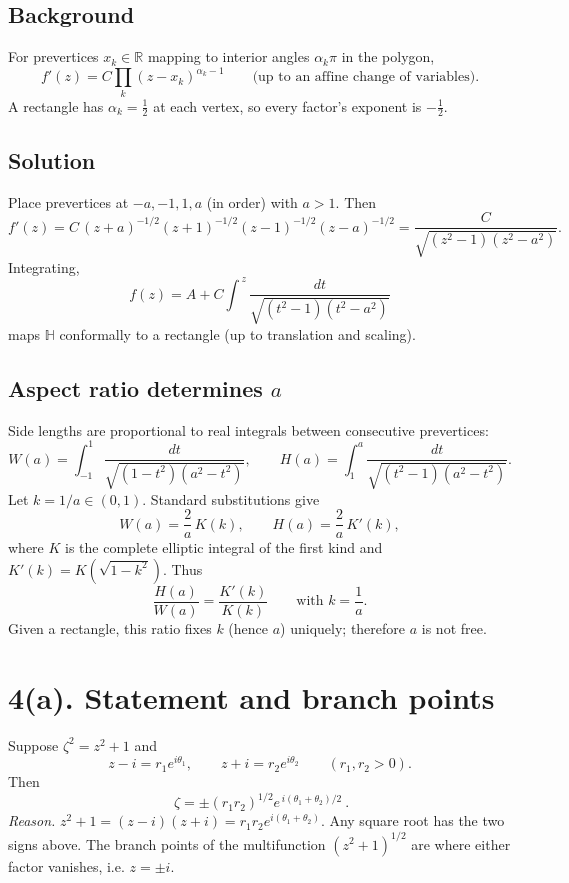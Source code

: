 \documentclass[11pt]{article}
\begin{document}
	\subsection*{Background}
	For prevertices \(x_k\in\mathbb R\) mapping to interior angles \(\alpha_k\pi\) in the polygon,
	\[
	f'(z)=C\prod_k (z-x_k)^{\alpha_k-1}\qquad\text{(up to an affine change of variables).}
	\]
	A rectangle has \(\alpha_k=\tfrac12\) at each vertex, so every factor’s exponent is \(-\tfrac12\).
	
	\subsection*{Solution}
	Place prevertices at \(-a,-1,1,a\) (in order) with \(a>1\).
	Then
	\[
	f'(z)=C\,(z{+}a)^{-1/2}(z{+}1)^{-1/2}(z{-}1)^{-1/2}(z{-}a)^{-1/2}
	=\frac{C}{\sqrt{(z^{2}-1)(z^{2}-a^{2})}}.
	\]
	Integrating,
	\[
	\boxed{\qquad f(z)=A+C\int^{\,z}\frac{dt}{\sqrt{(t^{2}-1)(t^{2}-a^{2})}}\qquad}
	\]
	maps \(\mathbb H\) conformally to a rectangle (up to translation and scaling).
	
	\subsection*{Aspect ratio determines \(a\)}
	Side lengths are proportional to real integrals between consecutive prevertices:
	\[
	W(a)=\int_{-1}^{1}\frac{dt}{\sqrt{(1-t^{2})(a^{2}-t^{2})}},\qquad
	H(a)=\int_{1}^{a}\frac{dt}{\sqrt{(t^{2}-1)(a^{2}-t^{2})}}.
	\]
	Let \(k=1/a\in(0,1)\). Standard substitutions give
	\[
	W(a)=\frac{2}{a}\,K(k),\qquad H(a)=\frac{2}{a}\,K'(k),
	\]
	where \(K\) is the complete elliptic integral of the first kind and \(K'(k)=K(\sqrt{1-k^{2}})\).
	Thus
	\[
	\frac{H(a)}{W(a)}=\frac{K'(k)}{K(k)}\qquad\text{with }k=\frac{1}{a}.
	\]
	Given a rectangle, this ratio fixes \(k\) (hence \(a\)) uniquely; therefore \(a\) is not free.
	
	\bigskip
	
	
	\section*{4(a). Statement and branch points}
	Suppose \(\zeta^2=z^2+1\) and
	\[
	z-i=r_1e^{i\theta_1},\qquad z+i=r_2e^{i\theta_2}\qquad (r_1,r_2>0).
	\]
	Then
	\[
	\boxed{\ \zeta=\pm(r_1r_2)^{1/2}e^{\,i(\theta_1+\theta_2)/2}\ }.
	\]
	\emph{Reason.} \(z^2+1=(z-i)(z+i)=r_1r_2e^{i(\theta_1+\theta_2)}\). Any square root has the two signs above.
	The branch points of the multifunction \((z^2+1)^{1/2}\) are where either factor vanishes, i.e. \(z=\pm i\).
	
\end{document}
